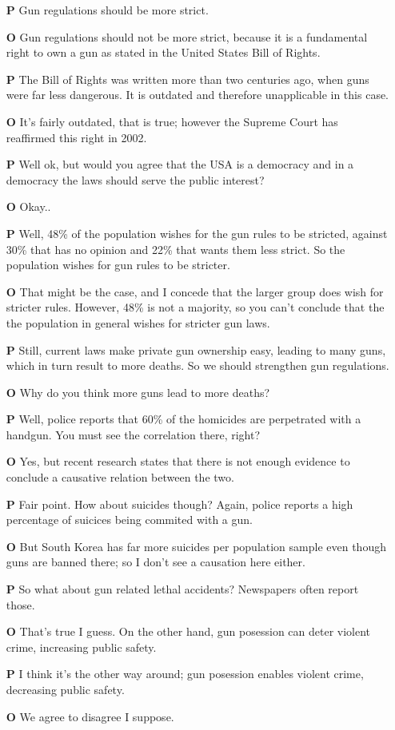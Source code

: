 \documentclass[]{article}
\begin{document}
\begin{itemize}
\item[\textbf{P}]  Gun regulations should be more strict.
\item[\textbf{O}]  Gun regulations should not be more strict, because it is a fundamental right to own a gun as stated in the United States Bill of Rights.
\item[\textbf{P}]  The Bill of Rights was written more than two centuries ago, when guns were far less dangerous. It is outdated and therefore unapplicable in this case.
\item[\textbf{O}]  It's fairly outdated, that is true; however the Supreme Court has reaffirmed this right in 2002.
\item[\textbf{P}]  Well ok, but would you agree that the USA is a democracy and in a democracy the laws should serve the public interest?
\item[\textbf{O}]  Okay..
\item[\textbf{P}]  Well, 48\% of the population wishes for the gun rules to be stricted, against 30\% that has no opinion and 22\% that wants them less strict. So the population wishes for gun rules to be stricter.
\item[\textbf{O}]  That might be the case, and I concede that the larger group does wish for stricter rules. However, 48\% is not a majority, so you can't conclude that the the population in general wishes for stricter gun laws.
\item[\textbf{P}]  Still, current laws make private gun ownership easy, leading to many guns, which in turn result to more deaths. So we should strengthen gun regulations. 
\item[\textbf{O}]  Why do you think more guns lead to more deaths?
\item[\textbf{P}]  Well, police reports that 60\% of the homicides are perpetrated with a handgun. You must see the correlation there, right?
\item[\textbf{O}]  Yes, but recent research states that there is not enough evidence to conclude a causative relation between the two.
\item[\textbf{P}] Fair point. How about suicides though? Again, police reports a high percentage of suicices being commited with a gun.
\item[\textbf{O}]  But South Korea has far more suicides per population sample even though guns are banned there; so I don't see a causation here either.
\item[\textbf{P}]  So what about gun related lethal accidents? Newspapers often report those.
\item[\textbf{O}]  That's true I guess. On the other hand, gun posession can deter violent crime, increasing public safety.
\item[\textbf{P}]  I think it's the other way around; gun posession enables violent crime, decreasing public safety.
\item[\textbf{O}]  We agree to disagree I suppose.
\end{itemize} 
\end{document}
